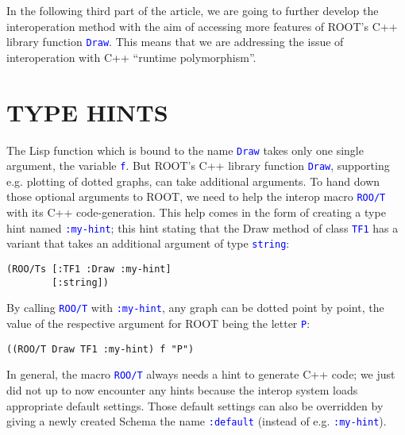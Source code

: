 \documentclass[twocolumn]{article}
\begin{document}
In the following third part of the article, we are going to further develop the interoperation method with the aim of accessing more features of ROOT’s C++ library function \texttt{\textcolor{blue}{Draw}}. This means that we are addressing the issue of interoperation with C++ “runtime polymorphism”.

\section{TYPE HINTS}
The Lisp function which is bound to the name \texttt{\textcolor{blue}{Draw}} takes only one single argument, the variable \texttt{\textcolor{blue}{f}}. But ROOT’s C++ library function \texttt{\textcolor{blue}{Draw}}, supporting e.g. plotting of dotted graphs, can take additional arguments. To hand down those optional arguments to ROOT, we need to help the interop macro \texttt{\textcolor{blue}{ROO/T}} with its C++ code-generation. This help comes in the form of creating a type hint named \texttt{\textcolor{blue}{:my-hint}}; this hint stating that the Draw method of class \texttt{\textcolor{blue}{TF1}} has a variant that takes an additional argument of type \texttt{\textcolor{blue}{string}}:
{\color{blue}\begin{verbatim}
(ROO/Ts [:TF1 :Draw :my-hint]
        [:string])
\end{verbatim}}
By calling \texttt{\textcolor{blue}{ROO/T}} with \texttt{\textcolor{blue}{:my-hint}}, any graph can be dotted point by point, the value of the respective argument for ROOT being the letter \texttt{\textcolor{blue}{P}}:
{\color{blue}\begin{verbatim}
((ROO/T Draw TF1 :my-hint) f "P")
\end{verbatim}}
In general, the macro \texttt{\textcolor{blue}{ROO/T}} always needs a hint to generate C++ code; we just did not up to now encounter any hints because the interop system loads appropriate default settings. Those default settings can also be overridden by giving a newly created Schema the name \texttt{\textcolor{blue}{:default}} (instead of e.g. \texttt{\textcolor{blue}{:my-hint}}).
\end{document}
